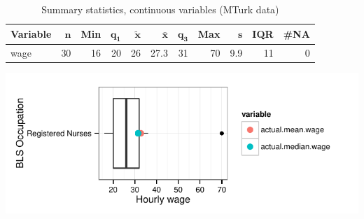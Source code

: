 \documentclass[a4paper,10pt]{article}\usepackage[]{graphicx}\usepackage[]{color}
\makeatletter
\def\maxwidth{ %
  \ifdim\Gin@nat@width>\linewidth
    \linewidth
  \else
    \Gin@nat@width
  \fi
}
\makeatother
\begin{document}
\begin{table}[ht]
\centering
{\footnotesize
\begin{tabular}{lrrrrrrrrrr}
 \textbf{Variable} & $\mathbf{n}$ & \textbf{Min} & $\mathbf{q_1}$ & $\mathbf{\widetilde{x}}$ & $\mathbf{\bar{x}}$ & $\mathbf{q_3}$ & \textbf{Max} & $\mathbf{s}$ & \textbf{IQR} & \textbf{\#NA} \\ 
  \hline
wage & 30 & 16 & 20 & 26 & 27.3 & 31 & 70 & 9.9 & 11 & 0 \\ 
  \end{tabular}
}
\caption{Summary statistics, continuous variables (MTurk data)} 
\label{tab2:29-1140}
\end{table}


{\centering \includegraphics[width=\maxwidth]{figure/unnamed-chunk-29} 

}
\end{document}
